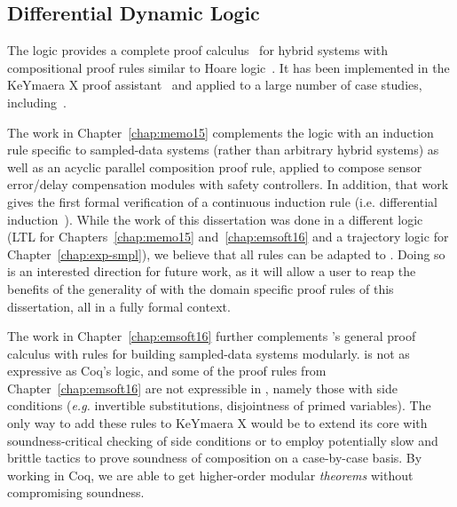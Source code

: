 \subsection{Differential Dynamic Logic}
\label{sec:related-logic-dl}
The \dL{} logic provides a complete proof
calculus~\cite{Platzer15substitution} for hybrid systems with compositional
proof rules similar to Hoare logic~\cite{hoare1971find}.  It has been
implemented in the KeYmaera X proof assistant~\cite{KeYmaeraX} and applied
to a large number of case studies,
including~\cite{platzercruise11,platzer2009formal,platzerrobots13,Arechiga12refinement}.

The work in Chapter~\ref{chap:memo15} complements the \dL{} logic with an
induction rule specific to sampled-data systems (rather than arbitrary
hybrid systems) as well as an acyclic parallel composition proof rule,
applied to compose sensor error/delay compensation modules with safety
controllers. In addition, that work gives the first formal verification of
a continuous induction rule (i.e. differential
induction~\cite{Ghorbal14diffinv}). While the work of this dissertation was
done in a different logic (LTL for Chapters~\ref{chap:memo15}
and~\ref{chap:emsoft16} and a trajectory logic for
Chapter~\ref{chap:exp-smpl}), we believe that all rules can be adapted to
\dL{}. Doing so is an interested direction for future work, as it will
allow a user to reap the benefits of the generality of \dL{} with the
domain specific proof rules of this dissertation, all in a fully formal
context.

The work in Chapter~\ref{chap:emsoft16} further complements \dL{}'s general
proof calculus with rules for building sampled-data systems modularly.
\dL{} is not as expressive as Coq's logic, and some of the proof rules from
Chapter~\ref{chap:emsoft16} are not expressible in \dL{}, namely those with
side conditions (\emph{e.g.}  invertible substitutions, disjointness of
primed variables).  The only way to add these rules to KeYmaera X would be
to extend its core with soundness-critical checking of side conditions or
to employ potentially slow and brittle tactics to prove soundness of
composition on a case-by-case basis.  By working in Coq, we are able to get
higher-order modular \emph{theorems} without compromising soundness.

